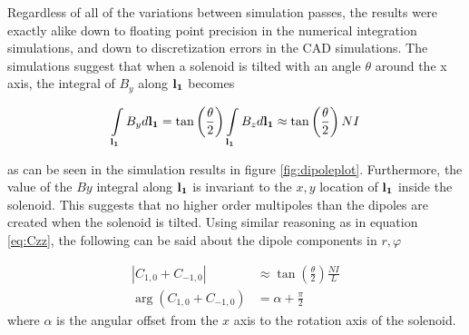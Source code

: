 Regardless of all of the variations between simulation passes, the results were
exactly alike down to floating point precision in the numerical integration
simulations, and down to discretization errors in the CAD simulations.
The simulations suggest that when a solenoid is tilted with an angle $\theta$
around the x axis, the integral of $B_y$ along $\vb{l_1}$ becomes

\begin{equation}
    \int\limits_{\vb{l_1}}B_y d\vb{l_1} =
    \tan\left( \frac{\theta}{2} \right)  \int\limits_{\vb{l_1}}B_z d\vb{l_1}
    \approx \tan\left( \frac{\theta}{2} \right) NI
\end{equation}

as can be seen in the simulation results in figure \ref{fig:dipoleplot}.
Furthermore, the value of the $By$ integral along $\vb{l_1}$
is invariant to the $x,y$ location of $\vb{l_1}$ inside the solenoid.
This suggests that no higher order multipoles than the dipoles are
created when the solenoid is tilted. Using similar reasoning as 
in equation \ref{eq:Czz}, the following can be said about the 
dipole components in $r, \varphi$

\begin{align}
    |C_{1,0} + C_{-1,0}| &\approx \tan\left( \frac{\theta}{2} \right) \frac{NI}{L} \\
    \arg(C_{1,0} + C_{-1,0}) &= \alpha + \frac{\pi}{2}
\end{align}
where $\alpha$ is the angular offset from the $x$ axis to the rotation
axis of the solenoid.
